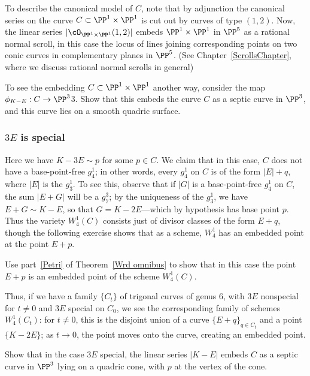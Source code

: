 To describe the canonical model of $C$, note that by adjunction the canonical series on the curve $C \subset \PP^1 \times \PP^1$ is cut out by curves of type $(1,2)$. Now, the linear series $|\cO_{\PP^1 \times \PP^1}(1,2)|$ embeds $\PP^1 \times \PP^1$ in $\PP^5$ as a rational normal scroll, in this case the locus of lines joining corresponding points on two conic curves in complementary planes in $\PP^5$. (See Chapter~\ref{ScrollsChapter}, where we discuss rational normal scrolls in general)

\begin{exercise}
To see the embedding $C \subset \PP^1 \times \PP^1$ another way, consider the map $\phi_{K-E} : C \to \PP^3$3. Show that this embeds the curve $C$ as a septic curve in $\PP^3$, and this curve lies on a smooth quadric surface.
\end{exercise}

\subsubsection{$3E$ is special}  Here we have $K - 3E \sim p$ for some $p \in C$. We claim that in this case, $C$ does not have a base-point-free $g^1_4$; in other words, every $g^1_4$ on $C$ is of the form $|E| + q$, where $|E|$ is the $g^1_3$. To see this, observe that if $|G|$ is a base-point-free $g^1_4$ on $C$, the sum $|E+G|$ will be a $g^3_7$; by the uniqueness of the $g^1_3$, we have $E+G \sim K - E$, so that $G = K-2E$---which by hypothesis has base point $p$. Thus the variety $W^1_4(C)$ consists just of divisor classes of the form $E+q$, though the following exercise shows that as a scheme, $W^1_4$ has an embedded point at the point $E+p$.

\begin{exercise}
Use part~\ref{Petri} of Theorem~\ref{Wrd omnibus} to show that in this case the point $E+p$ is an embedded point of the scheme $W^1_4(C)$.
\end{exercise} 

Thus, if we have a family $\{C_t\}$ of trigonal curves of genus 6, with $3E$ nonspecial for $t \neq 0$ and $3E$ special on $C_0$, we see the corresponding family of schemes $W^1_4(C_t)$: for $t \neq 0$, this is the disjoint union of a curve $\{E+q\}_{q \in C_t}$ and a point $\{K-2E\}$; as $t \to 0$, the point moves onto the curve, creating an embedded point.

\begin{exercise}
Show that in the case $3E$ special, the linear series $|K-E|$ embeds $C$ as a septic curve in $\PP^3$ lying on a quadric cone, with $p$ at the vertex of the cone.
\end{exercise}

